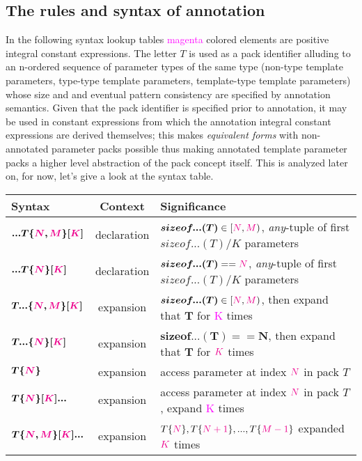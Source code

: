 
\subsection{The rules and syntax of annotation}

\p In the following syntax lookup tables \textcolor{Magenta}{magenta} colored elements are positive integral constant expressions.
The letter $T$ is used as a pack identifier alluding to an n-ordered sequence of parameter types of the same type (non-type template parameters, type-type template parameters, template-type template parameters) whose size and and eventual pattern consistency are specified by annotation semantics.
Given that the pack identifier is specified prior to annotation, it may be used in constant expressions from which the annotation integral constant expressions are derived themselves; this makes \textit{equivalent forms} with non-annotated parameter packs possible thus making annotated template parameter packs a higher level abstraction of the pack concept itself.
This is analyzed later on, for now, let's give a look at the syntax table.

\begin{tabularx}{\textwidth}{l|c|X}
  \textbf{Syntax} & \textbf{Context}  &\textbf{Significance} \\
\hline
$\bm{...T\{\textcolor{Magenta}{\textcolor{Magenta}{N}},\textcolor{Magenta}{M}\}[\textcolor{Magenta}{K}]}$ & declaration & $\bm{sizeof...(T)} \in [\textcolor{Magenta}{N},\textcolor{Magenta}{M})$, \textit{any}-tuple of first $sizeof...(T)/K$ parameters \\
$\bm{...T\{\textcolor{Magenta}{N}\}[\textcolor{Magenta}{K}]}$ & declaration & $\bm{sizeof...(T)} == \textcolor{Magenta}{N}$, \textit{any}-tuple of first $sizeof...(T)/K$ parameters \\
$\bm{T...\{\textcolor{Magenta}{N},\textcolor{Magenta}{M}\}[\textcolor{Magenta}{K}]}$ & expansion & $\bm{sizeof...(T)} \in [\textcolor{Magenta}{N},\textcolor{Magenta}{M})$, then expand that ${\bm{T}}$ for \textcolor{Magenta}{K} times   \\
$\bm{T...\{\textcolor{Magenta}{N}\}[\textcolor{Magenta}{K}]}$ & expansion & $\bm{sizeof...(T) == N}$, then expand that ${\bm{T}}$ for $\textcolor{Magenta}{K}$ times\\
$\bm{T\{\textcolor{Magenta}{N}\}}$ & expansion & access parameter at index $\textcolor{Magenta}{N}$ in pack $T$ \\
$\bm{T\{\textcolor{Magenta}{N}\}[\textcolor{Magenta}{K}]...}$ & expansion & access parameter at index $\textcolor{Magenta}{N}$ in pack $T$, expand \textcolor{Magenta}{K} times\\
$\bm{T\{\textcolor{Magenta}{N},\textcolor{Magenta}{M}\}[\textcolor{Magenta}{K}]...}$ & expansion & $T\{\textcolor{Magenta}{N}\},T\{\textcolor{Magenta}{N+1}\},...,T\{\textcolor{Magenta}{M-1}\}$ expanded $\textcolor{Magenta}{K}$ times \\
\end{tabularx}

